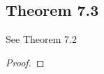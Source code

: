 \documentclass[../../main.tex]{subfiles}
\begin{document}
\subsection{Theorem 7.3}
\begin{wts}
    See Theorem 7.2
\end{wts}
\begin{proof}

\end{proof}
\end{document}
